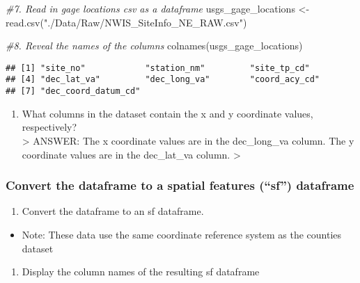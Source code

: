 \documentclass[
]{article}
\newenvironment{Shaded}{\begin{snugshade}}{\end{snugshade}}
\newcommand{\CommentTok}[1]{\textcolor[rgb]{0.56,0.35,0.01}{\textit{#1}}}
\newcommand{\FunctionTok}[1]{\textcolor[rgb]{0.00,0.00,0.00}{#1}}
\newcommand{\NormalTok}[1]{#1}
\newcommand{\OtherTok}[1]{\textcolor[rgb]{0.56,0.35,0.01}{#1}}
\newcommand{\StringTok}[1]{\textcolor[rgb]{0.31,0.60,0.02}{#1}}
\providecommand{\tightlist}{%
  \setlength{\itemsep}{0pt}\setlength{\parskip}{0pt}}
\begin{document}
\begin{Shaded}
\begin{Highlighting}[]
\CommentTok{\#7. Read in gage locations csv as a dataframe}
\NormalTok{usgs\_gage\_locations }\OtherTok{\textless{}{-}}\FunctionTok{read.csv}\NormalTok{(}\StringTok{"./Data/Raw/NWIS\_SiteInfo\_NE\_RAW.csv"}\NormalTok{)}

\CommentTok{\#8. Reveal the names of the columns}
\FunctionTok{colnames}\NormalTok{(usgs\_gage\_locations)}
\end{Highlighting}
\end{Shaded}

\begin{verbatim}
## [1] "site_no"            "station_nm"         "site_tp_cd"        
## [4] "dec_lat_va"         "dec_long_va"        "coord_acy_cd"      
## [7] "dec_coord_datum_cd"
\end{verbatim}

\begin{enumerate}
\def\labelenumi{\arabic{enumi}.}
\setcounter{enumi}{8}
\tightlist
\item
  What columns in the dataset contain the x and y coordinate values,
  respectively?\\
  \textgreater{} ANSWER: The x coordinate values are in the
  dec\_long\_va column. The y coordinate values are in the dec\_lat\_va
  column. \textgreater{}
\end{enumerate}

\hypertarget{convert-the-dataframe-to-a-spatial-features-sf-dataframe}{%
\subsubsection{Convert the dataframe to a spatial features (``sf'')
dataframe}\label{convert-the-dataframe-to-a-spatial-features-sf-dataframe}}

\begin{enumerate}
\def\labelenumi{\arabic{enumi}.}
\setcounter{enumi}{9}
\tightlist
\item
  Convert the dataframe to an sf dataframe.
\end{enumerate}

\begin{itemize}
\tightlist
\item
  Note: These data use the same coordinate reference system as the
  counties dataset
\end{itemize}

\begin{enumerate}
\def\labelenumi{\arabic{enumi}.}
\setcounter{enumi}{10}
\tightlist
\item
  Display the column names of the resulting sf dataframe
\end{enumerate}
\end{document}
